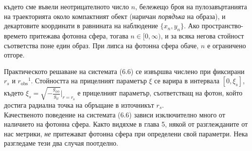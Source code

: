 където сме въвели неотрицателното число $n$, бележещо броя на пулозавъртанията на траекторията около компактният обект (наричан \emph{порядъка} на образа), и декартовите координати в равнината на наблюдение $\{x_n,y_n\}$. Ако пространство-времето притежава фотонна сфера, тогава $n \in [0,\infty)$, и за всяка негова стойност съответства поне един образ. При липса на фотонна сфера обаче, $n$ е ограничено отгоре.\\ 

Практическото решаване на системата (6.6) се извършва числено при фиксирани $r_s$ и $r_\text{obs}$$^1$. Стойността на прицелният параметър $\xi$ се варира в интервала $\left[0, \xi_s\right]$, където $\xi_s = \sqrt{-\frac{g_{\phi\phi}}{g_{tt}}}\big\vert_{r = r_\text{s}}$ е прицелният параметър, съответстващ на фотон, който достига радиална точка на обръщане в източникът $r_s$.\\

Качественото поведение на системата (6.6) зависи изключително много от наличието на фотонна сфера. Както видяхме в глава 5, някой от разглежданите от нас метрики, \emph{не} притежават фотонна сфера при определени свой параметри. Нека разгледаме тези два случая поотделно.
